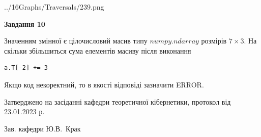 \documentclass[12pt, ukrainian]{article}
\begin{document}
{\begin {large}
\begin{center}
	{../16Graphs/Traversals/239.png}
\end{center}\par
\newpage

{\begin {center}\textbf{Завдання 10}\end {center}}\par
Значенням змінної  є цілочисловий масив типу $numpy.ndarray$ розмірів $7{\times}3$. На скільки збільшиться сума елементів масиву  після виконання
\begin{verbatim}
a.T[-2] += 3
\end{verbatim}


Якщо код некоректний, то в якості відповіді зазначити ERROR.\par
\newpage


\end {large}
}
{\smallskip \begin {small} Затверджено на засіданні кафедри теоретичної кібернетики, протокол  від   23.01.2023 р.\par\smallskip\smallskip
{\parbox {6.5 cm}{Зав. кафедри \dotfill Ю.В.~Крак}} \end{small}}
\end{document}
